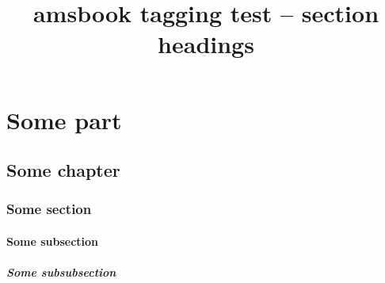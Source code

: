 \documentclass{amsbook}
\title{amsbook tagging test -- section headings}
\begin{document}
\part{Some part}
\chapter{Some chapter}
\section{Some section}
\subsection{Some subsection}
\subsubsection{Some subsubsection}
\end{document}
